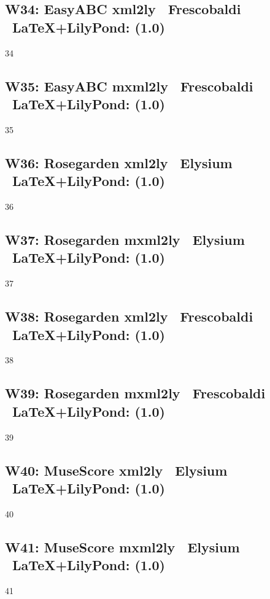 \subsection{W34: Easy\-ABC \ra xml2ly \ra\ Frescobaldi \ra\ \LaTeX+LilyPond: (1.0)}

34

\subsection{W35: Easy\-ABC \ra mxml2ly \ra\ Frescobaldi \ra\ \LaTeX+LilyPond: (1.0)} 

35

\subsection{W36: Rosegarden \ra xml2ly \ra\ Elysium \ra\ \LaTeX+LilyPond: (1.0)}

36

\subsection{W37: Rosegarden \ra mxml2ly \ra\ Elysium \ra\ \LaTeX+LilyPond: (1.0)}

37

\subsection{W38: Rosegarden \ra xml2ly \ra\ Frescobaldi \ra\ \LaTeX+LilyPond: (1.0)}

38

\subsection{W39: Rosegarden \ra mxml2ly \ra\ Frescobaldi \ra\ \LaTeX+LilyPond: (1.0)}

39

\subsection{W40: MuseScore \ra xml2ly \ra\ Elysium \ra\ \LaTeX+LilyPond: (1.0)}

40

\subsection{W41: MuseScore \ra mxml2ly \ra\ Elysium \ra\ \LaTeX+LilyPond: (1.0)}

41

